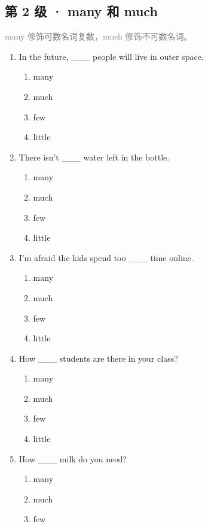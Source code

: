 \documentclass[11pt,a4paper]{ctexart}
\begin{document}
\subsection*{第 2 级 · many 和 much}
\noindent\textcolor{gray}{many 修饰可数名词复数，much 修饰不可数名词。}\par\smallskip
\begin{enumerate}[leftmargin=*,itemsep=4pt]
\item In the future, \_\_\_ people will live in outer space.
\begin{enumerate}[label=\Alph*.,leftmargin=2em,itemsep=1pt,topsep=2pt]
\item many
\item much
\item few
\item little
\end{enumerate}
\item There isn’t \_\_\_ water left in the bottle.
\begin{enumerate}[label=\Alph*.,leftmargin=2em,itemsep=1pt,topsep=2pt]
\item many
\item much
\item few
\item little
\end{enumerate}
\item I’m afraid the kids spend too \_\_\_ time online.
\begin{enumerate}[label=\Alph*.,leftmargin=2em,itemsep=1pt,topsep=2pt]
\item many
\item much
\item few
\item little
\end{enumerate}
\item How \_\_\_ students are there in your class?
\begin{enumerate}[label=\Alph*.,leftmargin=2em,itemsep=1pt,topsep=2pt]
\item many
\item much
\item few
\item little
\end{enumerate}
\item How \_\_\_ milk do you need?
\begin{enumerate}[label=\Alph*.,leftmargin=2em,itemsep=1pt,topsep=2pt]
\item many
\item much
\item few

\end{enumerate}
\end{enumerate}
\end{document}
